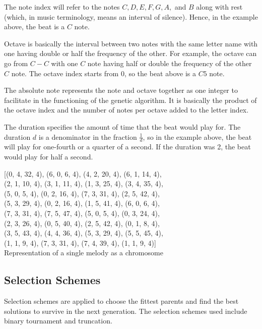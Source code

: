 \documentclass[conference]{IEEEtran}
\begin{document}
The note index will refer to the notes $C, D, E, F, G, A,$ and $B$ along with rest (which, in music terminology, means an interval of silence). Hence, in the example above, the beat is a $C$ note.

Octave is basically the interval between two notes with the same letter name with one having double or half the frequency of the other. For example, the octave can go from $C-C$ with one $C$ note having half or double the frequency of the other $C$ note. The octave index starts from 0, so the beat above is a $C5$ note.

The absolute note represents the note and octave together as one integer to facilitate in the functioning of the genetic algorithm. It is basically the product of the octave index and the number of notes per octave added to the letter index.

The duration specifies the amount of time that the beat would play for. The duration $d$ is a denominator in the fraction $\frac{1}{d}$, so in the example above, the beat will play for one-fourth or a quarter of a second. If the duration was 2, the beat would play for half a second.

\begin{center}
    [(0, 4, 32, 4), (6, 0, 6, 4), (4, 2, 20, 4), (6, 1, 14, 4),\\ (2, 1, 10, 4), (3, 1, 11, 4), (1, 3, 25, 4), (3, 4, 35, 4),\\ (5, 0, 5, 4), (0, 2, 16, 4), (7, 3, 31, 4), (2, 5, 42, 4),\\ (5, 3, 29, 4), (0, 2, 16, 4), (1, 5, 41, 4), (6, 0, 6, 4),\\ (7, 3, 31, 4), (7, 5, 47, 4), (5, 0, 5, 4), (0, 3, 24, 4),\\ (2, 3, 26, 4), (0, 5, 40, 4), (2, 5, 42, 4), (0, 1, 8, 4),\\ (3, 5, 43, 4), (4, 4, 36, 4), (5, 3, 29, 4), (5, 5, 45, 4),\\ (1, 1, 9, 4), (7, 3, 31, 4), (7, 4, 39, 4), (1, 1, 9, 4)]\\
    
    Representation of a single melody as a chromosome
\end{center}

\subsection{Selection Schemes}
Selection schemes are applied to choose the fittest parents and find the best solutions to survive in the next generation. The selection schemes used include binary tournament and truncation.
\end{document}
